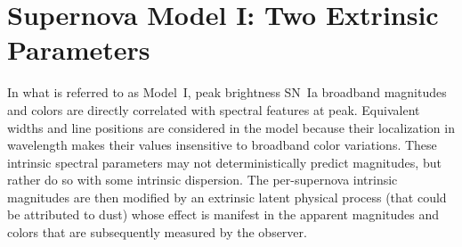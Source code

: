\documentclass{aastex61}   	%
\begin{document}
\section{Supernova Model I: Two Extrinsic Parameters}
\label{model:sec}

In what is  referred to as Model~I, peak brightness
SN~Ia broadband magnitudes and colors are 
directly
correlated with
spectral features
at peak.
Equivalent widths and line positions are considered in the model because their localization in wavelength
makes their values insensitive to 
broadband color variations.
These intrinsic spectral  parameters may not deterministically predict magnitudes, but rather do so with some intrinsic dispersion.
The per-supernova intrinsic magnitudes are then
modified by an extrinsic 
latent
physical process (that could be attributed to dust) 
whose effect is manifest in the
apparent magnitudes and colors
that are subsequently measured by the observer.
\end{document}
